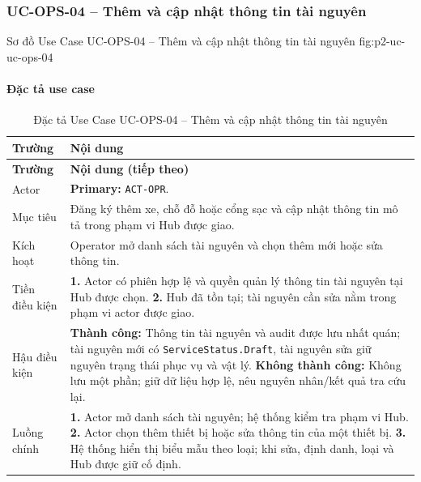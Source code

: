 \clearpage
\subsubsection{UC-OPS-04 -- Thêm và cập nhật thông tin tài nguyên}

  {Sơ đồ Use Case UC-OPS-04 -- Thêm và cập nhật thông tin tài nguyên}
  {fig:p2-uc-uc-ops-04}

\paragraph{Đặc tả use case}
\small
\begin{longtable}{|L{26mm}|L{118mm}|}
  \caption{Đặc tả Use Case UC-OPS-04 -- Thêm và cập nhật thông tin tài nguyên}\label{tab:spec-UC-OPS-04}\\
  \hline
  \textbf{Trường} & \textbf{Nội dung}\\\hline
  \endfirsthead
  \hline
  \textbf{Trường} & \textbf{Nội dung (tiếp theo)}\\\hline
  \endhead
  Actor & \textbf{Primary:} \texttt{ACT-OPR}.\\\hline
  Mục tiêu & Đăng ký thêm xe, chỗ đỗ hoặc cổng sạc và cập nhật thông tin mô tả trong phạm vi Hub được giao.\\\hline
  Kích hoạt & Operator mở danh sách tài nguyên và chọn thêm mới hoặc sửa thông tin.\\\hline
  Tiền điều kiện & \textbf{1.} Actor có phiên hợp lệ và quyền quản lý thông tin tài nguyên tại Hub được chọn.\newline
\textbf{2.} Hub đã tồn tại; tài nguyên cần sửa nằm trong phạm vi actor được giao.\\\hline
  Hậu điều kiện & \textbf{Thành công:} Thông tin tài nguyên và audit được lưu nhất quán; tài nguyên mới có \texttt{ServiceStatus.Draft}, tài nguyên sửa giữ nguyên trạng thái phục vụ và vật lý.\newline
  \textbf{Không thành công:} Không lưu một phần; giữ dữ liệu hợp lệ, nêu nguyên nhân/kết quả tra cứu lại.\\\hline
  Luồng chính & \textbf{1.} Actor mở danh sách tài nguyên; hệ thống kiểm tra phạm vi Hub.\newline
\textbf{2.} Actor chọn thêm thiết bị hoặc sửa thông tin của một thiết bị.\newline
\textbf{3.} Hệ thống hiển thị biểu mẫu theo loại; khi sửa, định danh, loại và Hub được giữ cố định.\newline

\end{longtable}
